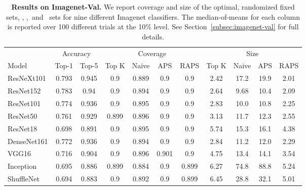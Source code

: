 \begin{table}[t] 
\centering 
\small 
\begin{tabular}{lcccccccccc} 
\toprule 
 & \multicolumn{2}{c}{Accuracy}  & \multicolumn{4}{c}{Coverage} & \multicolumn{4}{c}{Size} \\ 
\cmidrule(r){2-3}  \cmidrule(r){4-7}  \cmidrule(r){8-11} 
Model & Top-1 & Top-5 & Top K & Naive & APS & RAPS & Top K & Naive & APS & RAPS \\ 
\midrule 
 ResNeXt101 &  0.793 &  0.945 & 0.9 & 0.889 & 0.9 & 0.9 & 2.42 & 17.2 & 19.9 & 2.01 \\ 
 ResNet152 &  0.783 &  0.94 & 0.9 & 0.894 & 0.9 & 0.9 & 2.64 & 9.68 & 10.4 & 2.09 \\ 
 ResNet101 &  0.774 &  0.936 & 0.9 & 0.895 & 0.9 & 0.9 & 2.83 & 10.0 & 10.8 & 2.25 \\ 
 ResNet50 &  0.761 &  0.929 & 0.899 & 0.896 & 0.9 & 0.9 & 3.13 & 11.7 & 12.3 & 2.55 \\ 
 ResNet18 &  0.698 &  0.891 & 0.9 & 0.895 & 0.9 & 0.9 & 5.74 & 15.3 & 16.1 & 4.38 \\ 
 DenseNet161 &  0.772 &  0.936 & 0.9 & 0.894 & 0.9 & 0.9 & 2.84 & 11.2 & 12.0 & 2.29 \\ 
 VGG16 &  0.716 &  0.904 & 0.9 & 0.896 & 0.901 & 0.9 & 4.75 & 13.4 & 14.1 & 3.54 \\ 
 Inception &  0.695 &  0.886 & 0.899 & 0.884 & 0.9 & 0.899 & 6.27 & 74.8 & 88.8 & 5.24 \\ 
 ShuffleNet &  0.694 &  0.883 & 0.9 & 0.892 & 0.9 & 0.899 & 6.45 & 28.8 & 32.1 & 5.01 \\ 
\bottomrule 
\end{tabular} 
\caption{\textbf{Results on Imagenet-Val.} We report coverage and size of the optimal, randomized fixed sets, \naive, \aps,\ and \raps\ sets for nine different Imagenet classifiers. The median-of-means for each column is reported over 100 different trials at the 10\% level. See Section~\ref{subsec:imagenet-val} for full details.} 
\label{table:imagenet-val} 
\end{table} 

